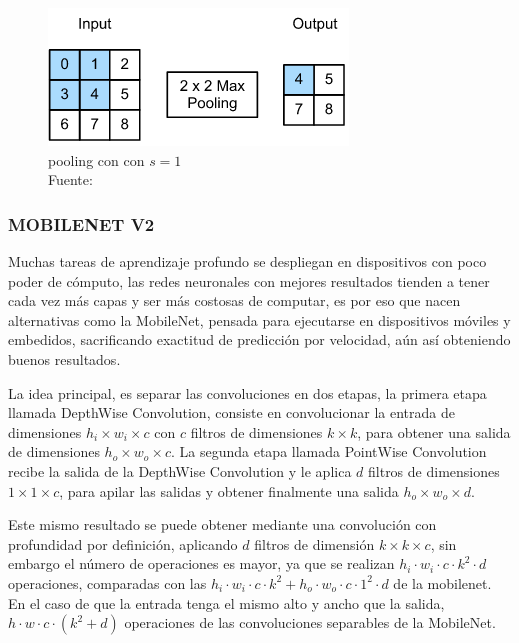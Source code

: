         \begin{figure}[H]
            \centering
			\includegraphics[scale=0.7]{imagenes/pooling}
            \caption[Pooling con con $s=1$]{pooling con con $s=1$\\ Fuente: \citep{zhang2020dive}}
        \end{figure}
        
        \subsubsection{MOBILENET V2}
        	Muchas tareas de aprendizaje profundo se despliegan en dispositivos con poco poder de cómputo, las redes neuronales con mejores resultados tienden a tener cada vez más capas y ser más costosas de computar, es por eso que nacen alternativas como la MobileNet, pensada para ejecutarse en dispositivos móviles y embedidos, sacrificando exactitud de predicción por velocidad, aún así obteniendo buenos resultados.
        	
        	La idea principal, es separar las convoluciones en dos etapas, la primera etapa llamada DepthWise Convolution, consiste en convolucionar la entrada de dimensiones $h_i\times w_i\times c$ con $c$ filtros de dimensiones $k\times k$, para obtener una salida de dimensiones $h_o\times w_o\times c$. La segunda etapa llamada PointWise Convolution recibe la salida de la DepthWise Convolution y le aplica $d$ filtros de dimensiones $1\times 1\times c$, para apilar las salidas y obtener finalmente una salida $h_o\times w_o\times d$.
        	
        	Este mismo resultado se puede obtener mediante una convolución con profundidad por definición, aplicando $d$ filtros de dimensión $k\times k\times c$, sin embargo el número de operaciones es mayor, ya que se realizan $h_i\cdot w_i\cdot c\cdot k^2\cdot d$ operaciones, comparadas con  las $h_i\cdot w_i\cdot c\cdot k^2 + h_o\cdot w_o\cdot c\cdot 1^2\cdot d$ de la mobilenet. En el caso de que la entrada tenga el mismo alto y ancho que la salida, $h\cdot w\cdot c\cdot(k^2 + d)$ operaciones de las convoluciones separables de la MobileNet.
        	
